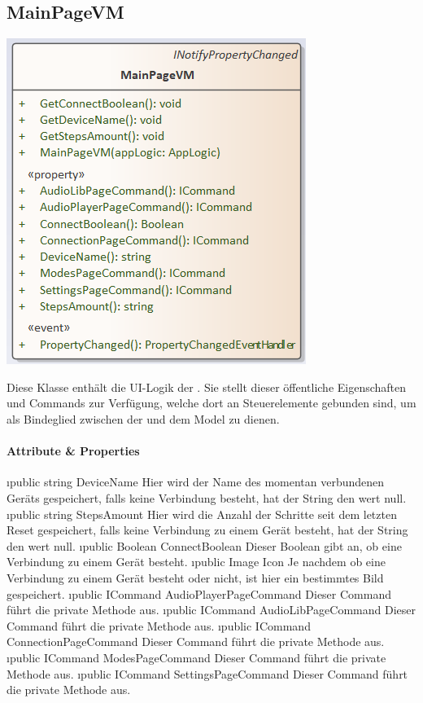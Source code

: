\documentclass[../entwurf.tex]{subfiles}
\begin{document}
\subsection{MainPageVM}
\begin{minipage}{0.55\textwidth}
\includegraphics[scale=0.75]{../graphics/vm_klassen/MainPageVM.png}
\end{minipage}
\begin{minipage}{0.45\textwidth}
Diese Klasse enthält die UI-Logik der . Sie stellt dieser öffentliche Eigenschaften und Commands zur Verfügung, welche dort an Steuerelemente gebunden sind, um als Bindeglied zwischen der  und dem Model zu dienen.
\end{minipage}
\paragraph{Attribute \& Properties}
\begin{itemize}
	\i{public string DeviceName} Hier wird der Name des momentan verbundenen Geräts gespeichert, falls keine Verbindung besteht, hat der String den wert null.
	\i{public string StepsAmount} Hier wird die Anzahl der Schritte seit dem letzten Reset gespeichert, falls keine Verbindung zu einem Gerät besteht, hat der String den wert null.
	\i{public Boolean ConnectBoolean} Dieser Boolean gibt an, ob eine Verbindung zu einem Gerät besteht.
	\i{public Image Icon} Je nachdem ob eine Verbindung zu einem Gerät besteht oder nicht, ist hier ein bestimmtes Bild gespeichert.
	\i{public ICommand AudioPlayerPageCommand} Dieser Command führt die private Methode  aus.
	\i{public ICommand AudioLibPageCommand} Dieser Command führt die private Methode  aus.
	\i{public ICommand ConnectionPageCommand} Dieser Command führt die private Methode  aus.
	\i{public ICommand ModesPageCommand} Dieser Command führt die private Methode  aus.
	\i{public ICommand SettingsPageCommand} Dieser Command führt die private Methode  aus.
\end{itemize}
\end{document}
